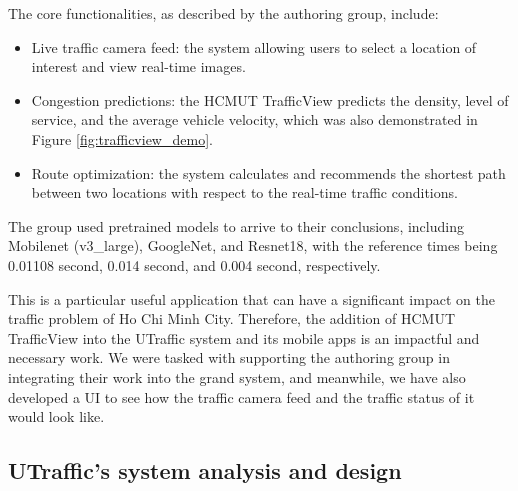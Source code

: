 The core functionalities, as described by the authoring group, include:
\begin{itemize}
    \item Live traffic camera feed: the system allowing users to select a location of interest and view real-time images.
    \item Congestion predictions: the HCMUT TrafficView predicts the density, level of service, and the average vehicle velocity, which was also demonstrated in Figure \ref{fig:trafficview_demo}.
    \item Route optimization: the system calculates and recommends the shortest path between two locations with respect to the real-time traffic conditions.
\end{itemize}

The group used pretrained models to arrive to their conclusions, including Mobilenet (v3\_large), GoogleNet, and Resnet18, with the reference times being 0.01108 second, 0.014 second, and 0.004 second, respectively.

This is a particular useful application that can have a significant impact on the traffic problem of Ho Chi Minh City. Therefore, the addition of HCMUT TrafficView into the UTraffic system and its mobile apps is an impactful and necessary work. We were tasked with supporting the authoring group in integrating their work into the grand system, and meanwhile, we have also developed a UI to see how the traffic camera feed and the traffic status of it would look like. 
\subsection{UTraffic's system analysis and design}

